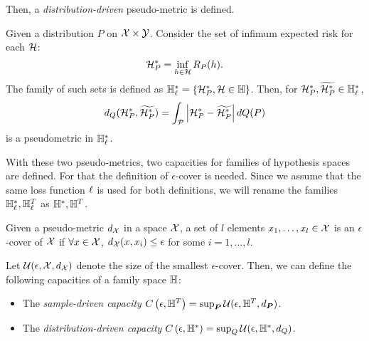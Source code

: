 %

Then, a \emph{distribution-driven} pseudo-metric is defined. 
\begin{definition}
    \label{def:dist_pseudometric}
    Given a distribution $P$ on $\mathcal{X} \times \mathcal{Y}$. Consider the set of infimum expected risk for each $\mathcal{H}$:
\begin{equation}
    \nonumber
    \mathcal{H}_P^* = \inf_{h \in \mathcal{H}} R_P(h).
\end{equation}
The family of such sets is defined as 
$\mathbb{H}^{*}_\ell = \left\{\mathcal{H}_P^*, \mathcal{H} \in \mathbb{H}\right\}$.
Then, for $\mathcal{H}_P^*, \widetilde{\mathcal{H}_P^*} \in \mathbb{H}_\ell^*$,
\begin{equation}
    \nonumber
    d_{Q}(\mathcal{H}_P^*, \widetilde{\mathcal{H}_P^*}) = \int_{\mathcal{P}} \left|\mathcal{H}_P^* - \widetilde{\mathcal{H}_P^*}\right| dQ(P)
\end{equation}
is a pseudometric in $\mathbb{H}_\ell^*$.
\end{definition}
With these two pseudo-metrics, two capacities for families of hypothesis spaces are defined. For that the definition of $\epsilon$-cover is needed. 
Since we assume that the same loss function $\ell$ is used for both definitions, we will rename the families $\mathbb{H}^*_\ell, \mathbb{H}^T_\ell$ as $\mathbb{H}^*, \mathbb{H}^T$.
\begin{definition}
    \label{def:epsilon_cover}
    Given a pseudo-metric $d_{\mathcal{X}}$ in a space $\mathcal{X}$, 
a set of $l$ elements $x_1, \ldots, x_l \in \mathcal{X}$ is an $\epsilon$-cover of $\mathcal{X}$ if 
$ \forall x \in \mathcal{X}$, $d_{\mathcal{X}}(x, x_i) \leq \epsilon $
for some $i=1, \ldots, l$.
\end{definition}
%
Let $\mathcal{U}(\epsilon, \mathcal{X}, d_{\mathcal{X}})$ denote the size of the smallest $\epsilon$-cover.
Then, we can define the following capacities of a family space $\mathbb{H}$:
\begin{itemize}
    \item The \emph{sample-driven capacity} $C\left(\epsilon, \mathbb{H}^{T}\right) = \sup_{\bm{P}} \mathcal{U}(\epsilon, \mathbb{H}^T, d_{\bm{P}})$.
    \item The \emph{distribution-driven capacity} $C\left(\epsilon, \mathbb{H}^{*}\right) = \sup_Q \mathcal{U}(\epsilon, \mathbb{H}^{*}, d_{Q})$.
\end{itemize}

